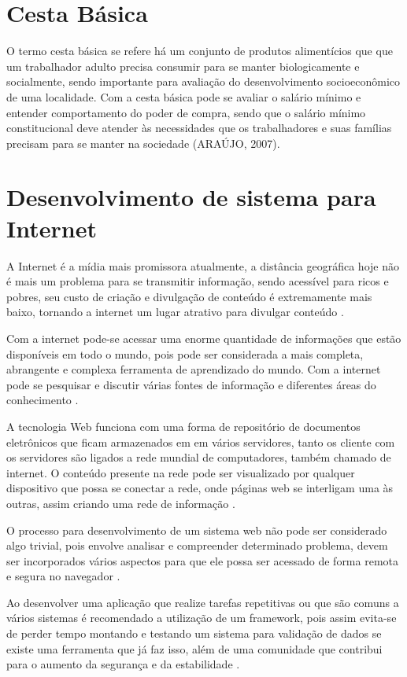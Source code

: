 \documentclass{ifto-tex}
\begin{document}
	\section{Cesta Básica}
	O termo cesta básica se refere há um conjunto de produtos alimentícios que que um trabalhador adulto precisa consumir para se manter biologicamente e socialmente, sendo importante para avaliação do desenvolvimento socioeconômico de uma localidade. Com a cesta básica pode se avaliar o salário mínimo e entender comportamento do poder de compra, sendo que o salário mínimo constitucional deve atender às necessidades que os trabalhadores e suas famílias precisam para se manter na sociedade (ARAÚJO, 2007).
	
	\section{Desenvolvimento de sistema para Internet}
A Internet é a mídia mais promissora atualmente, a distância geográfica hoje não é mais um problema para se transmitir informação, sendo acessível para ricos e pobres, seu custo de criação e divulgação de conteúdo é extremamente mais baixo, tornando a internet um lugar atrativo para divulgar conteúdo \cite{moran1997utilizar}.

Com a internet pode-se acessar uma enorme quantidade de informações que estão disponíveis em todo o mundo, pois pode ser considerada a mais completa, abrangente e complexa ferramenta de aprendizado do mundo. Com a internet pode se pesquisar e discutir várias fontes de informação e diferentes áreas do conhecimento \cite{garcia2002internet}.

A tecnologia Web funciona com uma forma de repositório de documentos eletrônicos que ficam armazenados em em vários servidores, tanto os cliente com os servidores são ligados a rede mundial de computadores, também chamado de internet. O conteúdo presente na rede pode ser visualizado por qualquer dispositivo que possa se conectar a rede, onde páginas web se interligam uma às outras, assim criando uma rede de informação \cite{junior2009sistemas}.

O processo para desenvolvimento de um sistema web não pode ser considerado algo trivial, pois envolve analisar e compreender determinado problema, devem ser incorporados vários aspectos para que ele possa ser acessado de forma remota e segura no navegador \cite{miletto2014desenvolvimento}.

Ao desenvolver uma aplicação que realize tarefas repetitivas ou que são comuns a vários sistemas é recomendado a utilização de um framework, pois assim evita-se de perder tempo montando e testando um sistema para validação de dados se existe uma ferramenta que já faz isso, além de uma comunidade que contribui para o aumento da segurança e da estabilidade \cite{OqueeumF24:online}.
\end{document}
